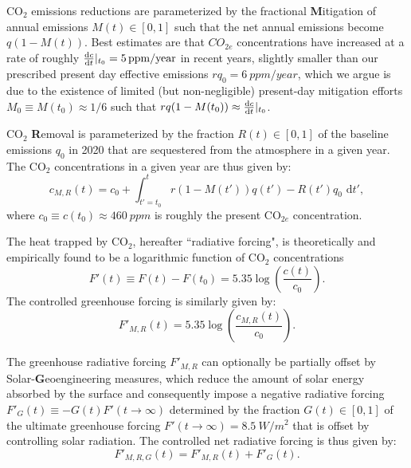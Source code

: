 \documentclass{article}
\begin{document}
CO$_{2}$ emissions reductions are parameterized by the fractional \textbf{M}itigation of annual emissions $M(t) \in [0,1]$ such that the net annual emissions become $q(1-M(t))$. Best estimates are that $CO_{2e}$ concentrations have increased at a rate of roughly $\dv{c}{t}|_{t_{0}} = \SI{5}{ppm/year}$ in recent years, slightly smaller than our prescribed present day effective emissions $rq_{0}= \SI{6}{ppm/year}$, which we argue is due to the existence of limited (but non-negligible) present-day mitigation efforts $M_{0} \equiv M(t_{0}) \approx 1/6$ such that $rq(1-M(t_{0})) \approx \dv{c}{t}|_{t_{0}}$.

CO$_{2}$ \textbf{R}emoval is parameterized by the fraction $R(t) \in [0,1]$ of the baseline emissions $q_{0}$ in 2020 that are sequestered from the atmosphere in a given year. The CO$_{2}$ concentrations in a given year are thus given by:
\begin{equation}
    c_{M, R}(t) = c_{0} + \int_{t'=t_{0}}^{t} r(1-M(t'))q(t') - R(t')q_{0} \text{ d}t'\label{eq-CO2-conc},
\end{equation}
where $c_{0} \equiv c(t_{0}) \approx \SI{460}{ppm}$ is roughly the present CO$_{2e}$ concentration.

The heat trapped by CO$_{2}$, hereafter ``radiative forcing", is theoretically and empirically found to be a logarithmic function of CO$_{2}$ concentrations
\begin{equation}
    F'(t) \equiv F(t) - F(t_{0}) = 5.35 \log(\frac{c(t)}{c_{0}}).
\end{equation}
The controlled greenhouse forcing is similarly given by:
\begin{equation}
    F'_{M, R}(t) = 5.35 \log(\frac{c_{M, R}(t)}{c_{0}}).
\end{equation}

The greenhouse radiative forcing $F'_{M, R}$ can optionally be partially offset by Solar-\textbf{G}eoengineering measures, which reduce the amount of solar energy absorbed by the surface and consequently impose a negative radiative forcing $F'_{G}(t) \equiv -G(t)F'(t \rightarrow \infty)$ determined by the fraction $G(t) \in [0,1]$ of the ultimate greenhouse forcing  $F'(t \rightarrow \infty) = \SI{8.5}{W/m^{2}}$ that is offset by controlling solar radiation. The controlled net radiative forcing is thus given by:
\begin{equation}
    F'_{M, R, G}(t) = F'_{M, R}(t) + F'_{G}(t).
\end{equation}
\end{document}
